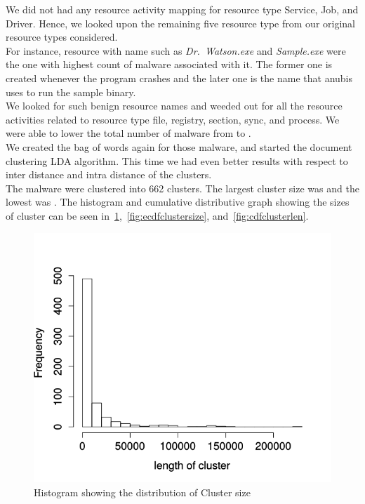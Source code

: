 We did not had any resource activity mapping for resource type Service, Job, and Driver. Hence, we looked upon the remaining five resource type from our original resource types considered.\\
For instance, resource with name such as \emph{Dr.\ Watson.exe} and \emph{Sample.exe} were the one with highest count of malware associated with it. The former one is created whenever the program crashes and the later one is the name that anubis uses to run the sample binary.\\
We looked for such benign resource names and weeded out for all the resource activities related to resource type file, registry, section, sync, and process. We were able to lower the total number of malware from {\gettotalmalwareii{}} to {\gettotalmalwareiii{}}.\\
We created the bag of words again for those {\gettotalmalwareiii{}} malware, and started the document clustering LDA algorithm. This time we had even better results with respect to inter distance and intra distance of the clusters.\\
The malware were clustered into 662 clusters. The largest cluster size was {\getlargestclustersize{}} and the lowest was {\getlowestclustersize{}}.
The histogram and cumulative distributive graph showing the sizes of cluster can be seen in~\ref{fig:histclustersize},~\ref{fig:ecdfclustersize}, and~\ref{fig:cdfclusterlen}.\\
\begin{figure}[htbp]
\begin{center}
  \includegraphics[scale=0.5]{figures/histclustersize.png}
\end{center}
\caption{Histogram showing the distribution of Cluster size}
\label{fig:histclustersize}
\end{figure}
